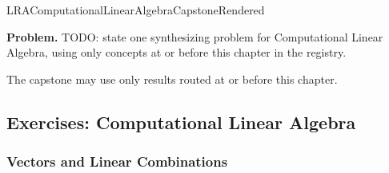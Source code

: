 \ifcsname LRAComputationalLinearAlgebraCapstoneRendered\endcsname
\else
\expandafter\gdef\csname LRAComputationalLinearAlgebraCapstoneRendered\endcsname{}

\newpage
{}
\label{cap:computational-linear-algebra}

\begin{tcolorbox}[
  colback=gray!6,
  colframe=gray!40,
  arc=2pt,
  left=8pt, right=8pt, top=6pt, bottom=6pt,
  title={\small\textbf{Capstone Problem}},
  fonttitle=\small\bfseries
]
\textbf{Problem.}
TODO: state one synthesizing problem for Computational Linear Algebra, using only concepts at or
before this chapter in the registry.
\end{tcolorbox}

\begin{remark*}
The capstone may use only results routed at or before this chapter.
\end{remark*}



\subsection*{Exercises: Computational Linear Algebra}

\subsubsection*{Vectors and Linear Combinations}

